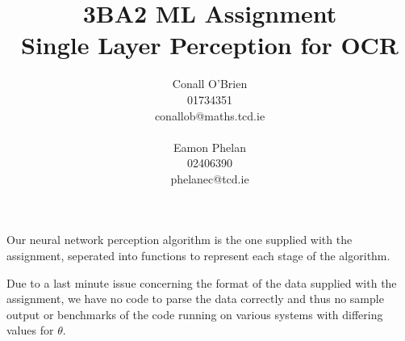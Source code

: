 \documentclass[a4paper,12pt]{article}
\begin{document}
\title{3BA2 ML Assignment \\ Single Layer Perception for OCR}

\author{Conall O'Brien \\ 01734351 \\ conallob@maths.tcd.ie \\ \\ Eamon Phelan \\ 02406390 \\ phelanec@tcd.ie}

\maketitle

Our neural network perception algorithm is the one supplied with the
assignment, seperated into functions to represent each stage of the
algorithm.


Due to a last minute issue concerning the format of the data supplied
with the assignment, we have no code to parse the data correctly and
thus no sample output or benchmarks of the code running on various
systems with differing values for $\theta$.
\end{document}
